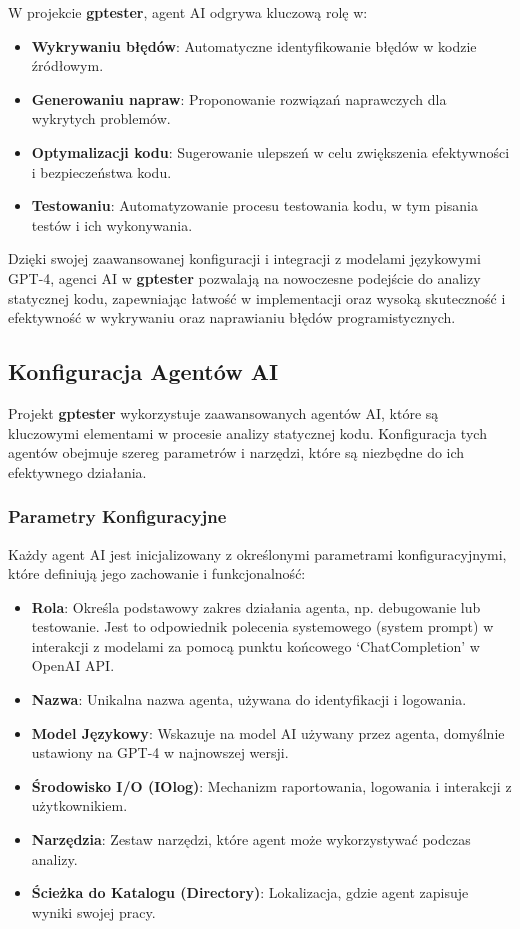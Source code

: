 W projekcie \textbf{gptester}, agent AI odgrywa kluczową rolę w:

\begin{itemize}
    \item \textbf{Wykrywaniu błędów}: Automatyczne identyfikowanie błędów w kodzie źródłowym.
    \item \textbf{Generowaniu napraw}: Proponowanie rozwiązań naprawczych dla wykrytych problemów.
    \item \textbf{Optymalizacji kodu}: Sugerowanie ulepszeń w celu zwiększenia efektywności i bezpieczeństwa kodu.
    \item \textbf{Testowaniu}: Automatyzowanie procesu testowania kodu, w tym pisania testów i ich wykonywania.
\end{itemize}

Dzięki swojej zaawansowanej konfiguracji i integracji z modelami językowymi GPT-4, agenci AI w \textbf{gptester} pozwalają na nowoczesne podejście do analizy statycznej kodu, zapewniając łatwość w implementacji oraz wysoką skuteczność i efektywność w wykrywaniu oraz naprawianiu błędów programistycznych.

\subsection{Konfiguracja Agentów AI}
\label{subsec:konfiguracja_agentow}

Projekt \textbf{gptester} wykorzystuje zaawansowanych agentów AI, które są kluczowymi elementami w procesie analizy statycznej kodu. Konfiguracja tych agentów obejmuje szereg parametrów i narzędzi, które są niezbędne do ich efektywnego działania.

\subsubsection{Parametry Konfiguracyjne}

Każdy agent AI jest inicjalizowany z określonymi parametrami konfiguracyjnymi, które definiują jego zachowanie i funkcjonalność:

\begin{itemize}
    \item \textbf{Rola}: Określa podstawowy zakres działania agenta, np. debugowanie lub testowanie. Jest to odpowiednik polecenia systemowego (system prompt) w interakcji z modelami za pomocą punktu końcowego `ChatCompletion' w OpenAI API.
    \item \textbf{Nazwa}: Unikalna nazwa agenta, używana do identyfikacji i logowania.
    \item \textbf{Model Językowy}: Wskazuje na model AI używany przez agenta, domyślnie ustawiony na GPT-4 w najnowszej wersji.
    \item \textbf{Środowisko I/O (IOlog)}: Mechanizm raportowania, logowania i interakcji z użytkownikiem.
    \item \textbf{Narzędzia}: Zestaw narzędzi, które agent może wykorzystywać podczas analizy.
    \item \textbf{Ścieżka do Katalogu (Directory)}: Lokalizacja, gdzie agent zapisuje wyniki swojej pracy.
\end{itemize}

